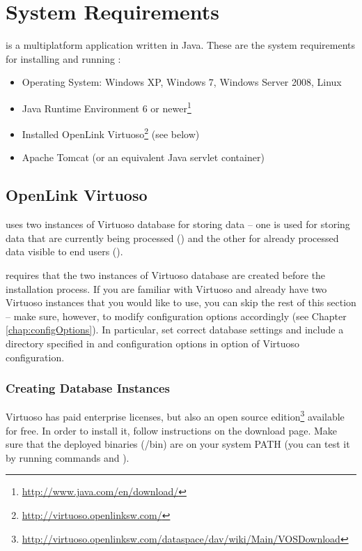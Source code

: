 \chapter{System Requirements}
\odcs is a multiplatform application written in Java. These are the system requirements for installing and running \odcs:

\begin{itemize}
  \item Operating System: Windows XP, Windows 7, Windows Server 2008, Linux
  \item Java Runtime Environment 6 or newer\footnote{\url{http://www.java.com/en/download/}}
  \item Installed OpenLink Virtuoso\footnote{\url{http://virtuoso.openlinksw.com/}} (see below)
  \item Apache Tomcat (or an equivalent Java servlet container)
\end{itemize}


\section{OpenLink Virtuoso}
\label{sec:virtuoso}
\odcs uses two instances of Virtuoso database for storing data -- one is used for storing data that are currently being processed () and the other for already processed data visible to end users (). 

\odcs requires that the two instances of Virtuoso database are created before the installation process. If you are familiar with Virtuoso and already have two Virtuoso instances that you would like to use, you can skip the rest of this section -- make sure, however, to modify \odcs configuration options accordingly  (see Chapter \ref{chap:configOptions}). In particular, set correct database settings and include a directory specified in  and  configuration options in  option of Virtuoso configuration.

\subsection{Creating Database Instances}
Virtuoso has paid enterprise licenses, but also an open source edition\footnote{\url{http://virtuoso.openlinksw.com/dataspace/dav/wiki/Main/VOSDownload}} available for free. In order to install it, follow instructions on the download page. Make sure that the deployed binaries (/bin) are on your system PATH (you can test it by running commands  and ).

